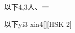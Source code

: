 \begin{entry}{以下}{4,3}{⼈、⼀}
  \begin{phonetics}{以下}{yi3 xia4}[][HSK 2]
  \end{phonetics}
\end{entry}
